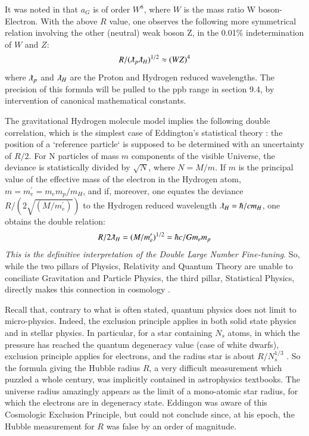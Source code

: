 \documentclass[twoside,draft]{article}
\begin{document}
\begin{sloppypar}
It was noted in \cite{Carr} that $a_{G}$ is of order $W^{8}$, where $W$ is the mass ratio W boson-Electron. With the above $R$ value, one observes the following more symmetrical relation involving the other (neutral) weak boson Z, in the 0.01\% indetermination of $W$ and $Z$:
\begin{equation}
R/(\lambdabar_{p}\lambdabar_{H})^{1/2}\approx (WZ)^4
\end{equation}
where $\lambdabar_{p}$ and $\lambdabar_{H}$ are the Proton and Hydrogen reduced wavelengths. The precision of this formula will be pulled to the ppb range in section 9.4, by intervention of canonical mathematical constants.

The gravitational Hydrogen molecule model \cite{Sanchez1} implies the following double correlation, which is the simplest case of Eddington's statistical theory \cite{Eddington}: the position of a `reference particle` is supposed to be determined 
with an uncertainty of ${R/2}$. 
For N particles of mass $m$ components of the visible Universe, the deviance is statistically divided by $\sqrt{N}$, where $N = M/m$. If $m$ is the principal value of the effective mass of the electron in the Hydrogen atom, $ m = m^{\prime}_{e} = m_{e} m_p/m_H $, and if, moreover, one equates the deviance $R/(2\sqrt{(M/m^{\prime}_{e})})$ to the Hydrogen reduced wavelength $\lambdabar_{H} = \hbar/c m_{H}$, one obtains the double relation:
\begin{equation}
R/2\lambdabar_{H} = (M/m^{\prime}_{e})^{1/2} = \hbar c/G m_{e} m_{p}
\end{equation}
\textit{This is the definitive interpretation of the Double Large Number Fine-tuning}. 
So, while the two pillars of Physics, Relativity and Quantum Theory are unable to conciliate Gravitation 
and Particle Physics, the third pillar, Statistical Physics, directly makes this connection in cosmology \cite{Eddington}.

Recall that, contrary to what is often stated, quantum physics does not limit to micro-physics. Indeed, the exclusion principle applies in both solid state physics and in stellar physics. In particular, for a star containing $N_s$ atoms, in which the pressure has reached the quantum degeneracy value (case of white dwarfs), exclusion principle applies for electrons, and the radius star is about $R/N_{s}^{1/3}$ \cite{Sanchez1}. So the formula giving the Hubble radius $R$, a very difficult measurement which puzzled a whole century, was implicitly contained in astrophysics textbooks. 
The universe radius amazingly appears as the limit of a mono-atomic star radius, for which the electrons are in degeneracy state. Eddingon was aware of this Cosmologic Exclusion Principle, but could not conclude since, at his epoch, the Hubble measurement for $R$ was false by an order of magnitude.


\end{sloppypar}
\end{document}
